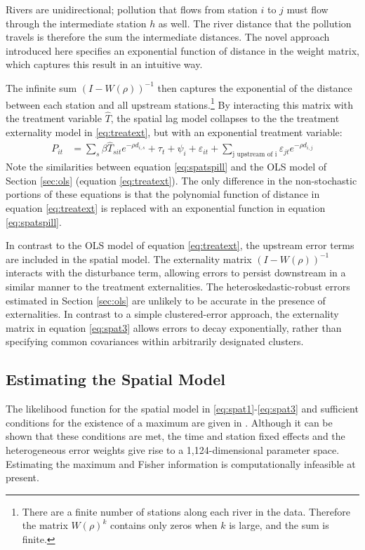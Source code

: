 \documentclass[12pt]{article}
\newcommand{\e}{\varepsilon}
\newcommand{\anum}[1]{\begin{align}#1\end{align}}
\renewcommand{\citet}[1]{\citeauthor{#1} \citeyearpar{#1}}
\begin{document}
Rivers are unidirectional; pollution that flows from station $i$ to $j$ must flow through the intermediate station $h$ as well. The river distance that the pollution travels is therefore the sum the intermediate distances. The novel approach introduced here specifies an exponential function of distance in the weight matrix, which captures this result in an intuitive way.

The infinite sum $(I - W(\rho))^{-1}$ then captures the exponential of the distance between each station and all upstream stations.\footnote{There are a finite number of stations along each river in the data. Therefore the matrix $W(\rho)^k$ contains only zeros when $k$ is large, and the sum is finite.} By interacting this matrix with the treatment variable $\widehat{T}$, the spatial lag model collapses to the the treatment externality model in \eqref{eq:treatext}, but with an exponential treatment variable:
\anum{
P_{it} &= \sum_{s} \beta \widehat{T}_{sit}e^{-\rho d_{i,s}} +  \tau_t + \psi_i + \e_{it} + \sum_{\text{j upstream of i}} \e_{jt} e^{-\rho d_{i,j}} \label{eq:spatspill}
}
Note the similarities between equation \eqref{eq:spatspill} and the OLS model of Section \ref{sec:ols} (equation \eqref{eq:treatext}). The only difference in the non-stochastic portions of these equations is that the polynomial function of distance in equation \eqref{eq:treatext} is replaced with an exponential function in equation \eqref{eq:spatspill}. 

In contrast to the OLS model of equation \eqref{eq:treatext}, the upstream error terms are included in the spatial model. The externality matrix $(I - W(\rho))^{-1}$ interacts with the disturbance term, allowing errors to persist downstream in a similar manner to the treatment externalities. The heteroskedastic-robust errors estimated in Section \ref{sec:ols} are unlikely to be accurate in the presence of externalities. In contrast to a simple clustered-error approach, the externality matrix in equation \eqref{eq:spat3} allows errors to decay exponentially, rather than specifying common covariances within arbitrarily designated clusters. 

\subsection{Estimating the Spatial Model}

The likelihood function for the spatial model in \eqref{eq:spat1}-\eqref{eq:spat3} and sufficient conditions for the existence of a maximum are given in \citet{anselin1988}. Although it can be shown that these conditions are met, the time and station fixed effects and the heterogeneous error weights give rise to a 1,124-dimensional parameter space. Estimating the maximum and Fisher information is computationally infeasible at present.  
\end{document}
